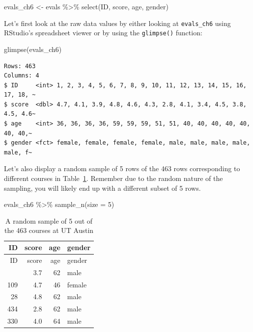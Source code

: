 \documentclass[
  letterpaper,
  DIV=11,
  numbers=noendperiod]{scrreprt}
\newenvironment{Shaded}{\begin{snugshade}}{\end{snugshade}}
\newcommand{\AttributeTok}[1]{\textcolor[rgb]{0.40,0.45,0.13}{#1}}
\newcommand{\DecValTok}[1]{\textcolor[rgb]{0.68,0.00,0.00}{#1}}
\newcommand{\FunctionTok}[1]{\textcolor[rgb]{0.28,0.35,0.67}{#1}}
\newcommand{\NormalTok}[1]{\textcolor[rgb]{0.00,0.23,0.31}{#1}}
\newcommand{\OtherTok}[1]{\textcolor[rgb]{0.00,0.23,0.31}{#1}}
\newcommand{\SpecialCharTok}[1]{\textcolor[rgb]{0.37,0.37,0.37}{#1}}
\theoremstyle{definition}
\theoremstyle{remark}
\begin{document}
\begin{Shaded}
\begin{Highlighting}[]
\NormalTok{evals\_ch6 }\OtherTok{\textless{}{-}}\NormalTok{ evals }\SpecialCharTok{\%\textgreater{}\%}
  \FunctionTok{select}\NormalTok{(ID, score, age, gender)}
\end{Highlighting}
\end{Shaded}

Let's first look at the raw data values by either looking at
\texttt{evals\_ch6} using RStudio's spreadsheet viewer or by using the
\texttt{glimpse()} function:

\begin{Shaded}
\begin{Highlighting}[]
\FunctionTok{glimpse}\NormalTok{(evals\_ch6)}
\end{Highlighting}
\end{Shaded}

\begin{verbatim}
Rows: 463
Columns: 4
$ ID     <int> 1, 2, 3, 4, 5, 6, 7, 8, 9, 10, 11, 12, 13, 14, 15, 16, 17, 18, ~
$ score  <dbl> 4.7, 4.1, 3.9, 4.8, 4.6, 4.3, 2.8, 4.1, 3.4, 4.5, 3.8, 4.5, 4.6~
$ age    <int> 36, 36, 36, 36, 59, 59, 59, 51, 51, 40, 40, 40, 40, 40, 40, 40,~
$ gender <fct> female, female, female, female, male, male, male, male, male, f~
\end{verbatim}

Let's also display a random sample of 5 rows of the 463 rows
corresponding to different courses in
Table~\ref{tbl-model4-data-preview}. Remember due to the random nature
of the sampling, you will likely end up with a different subset of 5
rows.

\begin{Shaded}
\begin{Highlighting}[]
\NormalTok{evals\_ch6 }\SpecialCharTok{\%\textgreater{}\%}
  \FunctionTok{sample\_n}\NormalTok{(}\AttributeTok{size =} \DecValTok{5}\NormalTok{)}
\end{Highlighting}
\end{Shaded}

\hypertarget{tbl-model4-data-preview}{}
\begin{longtable}[]{@{}rrrl@{}}
\caption{\label{tbl-model4-data-preview}A random sample of 5 out of the
463 courses at UT Austin}\tabularnewline
\toprule\noalign{}
ID & score & age & gender \\
\midrule\noalign{}
\endfirsthead
\toprule\noalign{}
ID & score & age & gender \\
\midrule\noalign{}
\endhead
\bottomrule\noalign{}
\endlastfoot
129 & 3.7 & 62 & male \\
109 & 4.7 & 46 & female \\
28 & 4.8 & 62 & male \\
434 & 2.8 & 62 & male \\
330 & 4.0 & 64 & male \\
\end{longtable}
\end{document}
